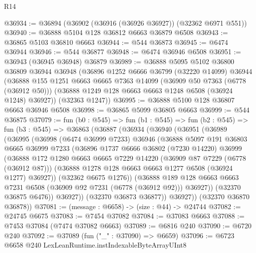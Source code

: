 \begin{lexlean}{R14}
\begin{coremodule}
@36934 := @36894 (@36902 (@36916 (@36926 @36927)) (@32362 @6971 @551))
@36940 := @36888 @5104 @128 @36812 @6663 @36879 @6508
@36943 := @36865 @5103 @36810 @6663
@36944 := @544 @36873
@36945 := @6474 @36944
@36946 := @544 @36877
@36948 := @6474 @36946 @6508
@36951 := @36943 (@36945 @36948) @36879
@36989 := @36888
    @5095
    @5102
    @36800
    @36809
    @36944
    @36948
    (@36896
      @1252
      @6666
      @36799
      (@32220 @14099)
      @36944
      (@36888
        @155
        @1251
        @6663
        @6665
        @7363
        @14099
        (@36909 @50 @7363 (@6778 (@36912 @50)))
        (@36888 @1249 @128 @6663 @6663 @1248 @6508 (@36924 @1248) @36927))
      (@32363 @1247))
@36995 := @36888 @5100 @128 @36807 @6663 @36946 @6508
@36998 := @36865 @5099 @36805 @6663
@36999 := @544 @36875
@37079 := fun (b0 : @545) =>
  fun (b1 : @545) =>
  fun (b2 : @545) =>
  fun (b3 : @545) =>
  @36863
    (@36887
      (@36934
        (@36940
          (@36951
            (@36989
              (@36995
                (@36998
                  (@6474 @36999 @7233)
                  @36946
                  (@36888
                    @5097
                    @191
                    @36803
                    @6665
                    @36999
                    @7233
                    (@36896
                      @1737
                      @6666
                      @36802
                      (@7230 @14220)
                      @36999
                      (@36888
                        @172
                        @1280
                        @6663
                        @6665
                        @7229
                        @14220
                        (@36909 @87 @7229 (@6778 (@36912 @87)))
                        (@36888 @1278 @128 @6663 @6663 @1277 @6508 (@36924 @1277) @36927))
                      (@32362 @6675 @1276))
                    (@36888
                      @189
                      @128
                      @6663
                      @6663
                      @7231
                      @6508
                      (@36909 @92 @7231 (@6778 (@36912 @92)))
                      @36927))
                  (@32370 @36875 @6476))
                @36927))
            (@32370 @36873 @36877))
          @36927))
      (@32370 @36870 @36878))
@37081 := (message : @6658) -> (size : @44) -> @24744
@37082 := @24745 @6675
@37083 := @7454 @37082
@37084 := @37083 @6663
@37088 := @7453 @37084 (@7474 @37082 @6663)
@37089 := @6816 @240
@37090 := @6720 @240
@37092 := @37089 (fun ("_" : @37090) => @6659)
@37096 := @6723 @6658 @240 LexLeanRuntime.instIndexableByteArrayUInt8

\end{coremodule}
\end{lexlean}
